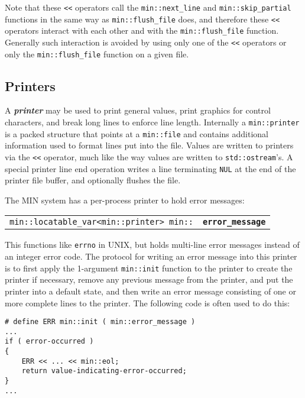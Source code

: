 \documentclass[12pt]{article}
\makeatletter
\newcommand{\key}[1]{{\bf \em #1}\index{#1}}
\newcommand{\ttindex}[1]{\index{#1@{\tt #1}}}
\newcommand{\minindex}[1]{\ttindex{min::#1}\ttindex{#1}}
\newcommand{\EOL}{\penalty \exhyphenpenalty}
\newenvironment{indpar}[1][0.3in]%
	{\begin{list}{}%
		     {\setlength{\itemsep}{0in}%
		      \setlength{\topsep}{0in}%
		      \setlength{\parsep}{1ex}%
		      \setlength{\labelwidth}{#1}%
		      \setlength{\leftmargin}{#1}%
		      \addtolength{\leftmargin}{\labelsep}}%
	 \item}%
	{\end{list}}
\newcommand{\LABEL}[1]{\label{#1}}
\newcommand{\MINKEY}[1]{{\tt \bf #1}\minindex{#1}}
\makeatother
\begin{document}
Note that these {\tt <<} operators call the {\tt min::\EOL next\_\EOL line}
and {\tt min::\EOL skip\_\EOL partial} functions in the same way as
{\tt min::\EOL flush\_\EOL file} does, and therefore
these {\tt <<} operators interact with each other and with the
{\tt min::\EOL flush\_\EOL file} function.  Generally such interaction
is avoided by using only one of the {\tt <<} operators or only
the {\tt min::\EOL flush\_\EOL file} function on a given file.

\subsection{Printers}
\label{PRINTERS}

A \key{printer} may be used to print general values, print graphics for
control characters, and break long lines to enforce line length.
Internally a {\tt min::\EOL printer} is
a packed structure that points at a {\tt min::\EOL file} and contains
additional information used to format lines put into the file.
Values are written to printers via the \verb|<<| operator, much like the
way values are written to {\tt std::\EOL ostream}'s.  A special
printer line end operation writes a line terminating {\tt NUL}
at the end of the printer file buffer, and optionally flushes the file.

The MIN system has a per-process printer to hold error messages:
\begin{indpar}[1em]\begin{tabular}{r@{}l}
\verb|min::locatable_var<min::printer> min::| & \MINKEY{error\_\EOL message}
\LABEL{MIN::ERROR_MESSAGE}%
\label{ERROR_MESSAGE} \\
\end{tabular}\end{indpar}

This functions like {\tt errno} in UNIX, but
holds multi-line error messages instead of an integer error
code.  The protocol for writing
an error message into this printer is to first apply
the 1-argument {\tt min::init} function to the printer to create the printer
if necessary, remove any previous message from the printer,
and put the printer into a default state,
and then write an error message consisting of one or more
complete lines to the printer.  The following code is often
used to do this:\label{ERROR_MESSAGE_EXAMPLE}
\begin{indpar}\begin{verbatim}
# define ERR min::init ( min::error_message )
...
if ( error-occurred )
{
    ERR << ... << min::eol;
    return value-indicating-error-occurred;
}
...
\end{verbatim}\end{indpar}
\end{document}

